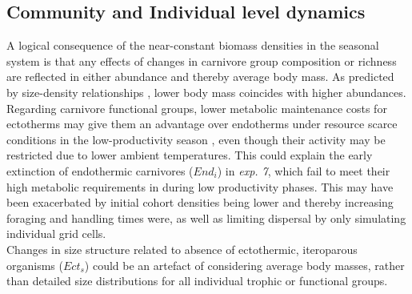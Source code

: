 \subsection{Community and Individual level dynamics}
A logical consequence of the near-constant biomass densities in the seasonal system is that any effects of changes in carnivore group composition or richness are reflected in either abundance and thereby average body mass. As predicted by size-density relationships \citep[cf.][]{White2007}, lower body mass coincides with higher abundances. \\
Regarding carnivore functional groups, lower metabolic maintenance costs for ectotherms may give them an advantage over endotherms under resource scarce conditions in the low-productivity season \citep{Shine2005}, even though their activity may be restricted due to lower ambient temperatures. 
This could explain the early extinction of endothermic carnivores ($End_i$) in \textit{exp. 7}, which fail to meet their high metabolic requirements in during low productivity phases. This may have been exacerbated by initial cohort densities being lower and thereby increasing foraging and handling times were, as well as limiting dispersal by only simulating individual grid cells.\\
Changes in size structure related to absence of ectothermic, iteroparous organisms ($Ect_s$) could be an artefact of considering average body masses, rather than detailed size distributions for all individual trophic or functional groups.
%
%


